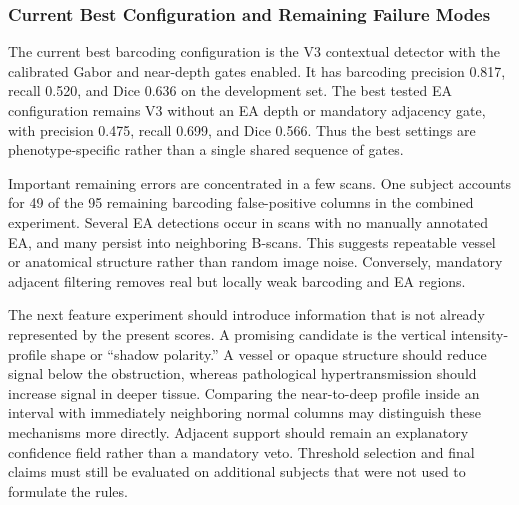 \documentclass[11pt]{article}
\begin{document}
\subsubsection{Current Best Configuration and Remaining Failure Modes}

The current best barcoding configuration is the V3 contextual detector with
the calibrated Gabor and near-depth gates enabled.  It has barcoding precision
0.817, recall 0.520, and Dice 0.636 on the development set.  The best tested EA
configuration remains V3 without an EA depth or mandatory adjacency gate, with
precision 0.475, recall 0.699, and Dice 0.566.  Thus the best settings are
phenotype-specific rather than a single shared sequence of gates.

Important remaining errors are concentrated in a few scans.  One subject
accounts for 49 of the 95 remaining barcoding false-positive columns in the
combined experiment.  Several EA detections occur in scans with no manually
annotated EA, and many persist into neighboring B-scans.  This suggests
repeatable vessel or anatomical structure rather than random image noise.
Conversely, mandatory adjacent filtering removes real but locally weak
barcoding and EA regions.

The next feature experiment should introduce information that is not already
represented by the present scores.  A promising candidate is the vertical
intensity-profile shape or ``shadow polarity.''  A vessel or opaque structure
should reduce signal below the obstruction, whereas pathological
hypertransmission should increase signal in deeper tissue.  Comparing the
near-to-deep profile inside an interval with immediately neighboring normal
columns may distinguish these mechanisms more directly.  Adjacent support
should remain an explanatory confidence field rather than a mandatory veto.
Threshold selection and final claims must still be evaluated on additional
subjects that were not used to formulate the rules.
\end{document}
